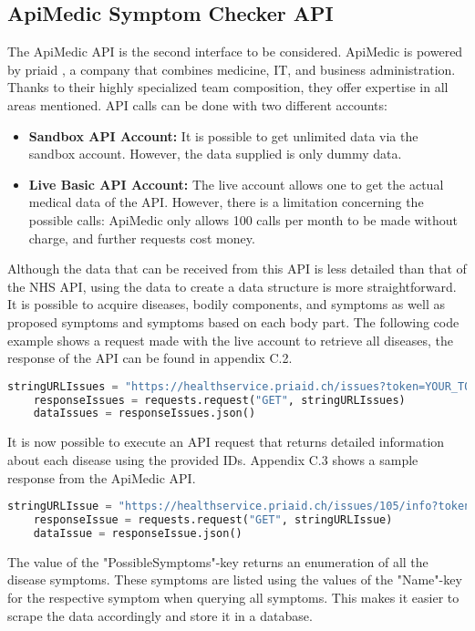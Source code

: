 \subsection{ApiMedic Symptom Checker API}
The ApiMedic API is the second interface to be considered. ApiMedic is powered by priaid \cite{.apimedic}, a company that combines medicine, IT, and business administration. Thanks to their highly specialized team composition, they offer expertise in all areas mentioned. API calls can be done with two different accounts:
\begin{itemize}
	\item \textbf{Sandbox API Account:}
	It is possible to get unlimited data via the sandbox account. However, the data supplied is only dummy data.
	\item \textbf{Live Basic API Account:}
	The live account allows one to get the actual medical data of the API. However, there is a limitation concerning the possible calls: ApiMedic only allows 100 calls per month to be made without charge, and further requests cost money.
\end{itemize}
Although the data that can be received from this API is less detailed than that of the NHS API, using the data to create a data structure is more straightforward. It is possible to acquire diseases, bodily components, and symptoms as well as proposed symptoms and symptoms based on each body part. The following code example shows a request made with the live account to retrieve all diseases, the response of the API can be found in appendix C.2.
\begin{lstlisting}[language=Python, caption={Example Python Request for the ApiMedic API (all issues)}]
	stringURLIssues = "https://healthservice.priaid.ch/issues?token=YOUR_TOKEN"
	responseIssues = requests.request("GET", stringURLIssues)
	dataIssues = responseIssues.json()
\end{lstlisting}
\noindent
It is now possible to execute an API request that returns detailed information about each disease using the provided IDs. Appendix C.3 shows a sample response from the ApiMedic API.
\begin{lstlisting}[language=Python, caption={Example Python Request for the ApiMedic API (single issue)}]
	stringURLIssue = "https://healthservice.priaid.ch/issues/105/info?token=YOUR_TOKEN"
	responseIssue = requests.request("GET", stringURLIssue)
	dataIssue = responseIssue.json()
\end{lstlisting}
\noindent 
The value of the "PossibleSymptoms"-key returns an enumeration of all the disease symptoms. These symptoms are listed using the values of the "Name"-key for the respective symptom when querying all symptoms. This makes it easier to scrape the data accordingly and store it in a database.

